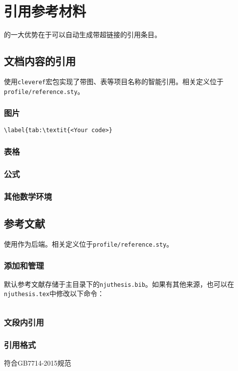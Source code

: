 \chapter{引用参考材料}

的一大优势在于可以自动生成带超链接的引用条目。

\section{文档内容的引用}

使用\lstinline|cleveref|宏包实现了带图、表等项目名称的智能引用。相关定义位于\lstinline|profile/reference.sty|。

\subsection{图片}

\lstinline|\label{tab:\textit{<Your code>}|

\subsection{表格}

\subsection{公式}



\subsection{其他数学环境}



\section{参考文献}

使用作为后端。相关定义位于\lstinline|profile/reference.sty|。

\subsection{添加和管理}

默认参考文献存储于主目录下的\lstinline|njuthesis.bib|。如果有其他来源，也可以在\lstinline|njuthesis.tex|中修改以下命令：
\begin{lstlisting}[language=TeX]

\end{lstlisting}

\subsection{文段内引用}

\subsection{引用格式}

符合GB7714-2015规范
